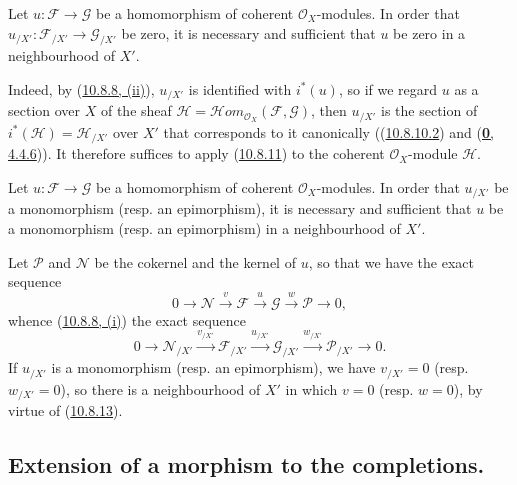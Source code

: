 \begin{corollary}[10.8.13]
\label{I.10.8.13}
Let $u:\mathscr{F}\to\mathscr{G}$ be a homomorphism of coherent
$\mathscr{O}_X$-modules. In order that
$u_{/X'}:\mathscr{F}_{/X'}\to\mathscr{G}_{/X'}$ be zero, it is necessary
and sufficient that $u$ be zero in a neighbourhood of $X'$.
\end{corollary}

Indeed, by (\hyperref[I.10.8.8]{10.8.8, (ii)}), $u_{/X'}$
is identified with $i^*(u)$, so if we regard $u$ as a section over
$X$ of the sheaf
$\mathscr{H}=\mathscr{H}\!om_{\mathscr{O}_X}(\mathscr{F},\mathscr{G})$,
then $u_{/X'}$ is the section of
$i^*(\mathscr{H})=\mathscr{H}_{/X'}$ over $X'$ that corresponds to it
canonically ((\hyperref[I.10.8.10.2]{10.8.10.2}) and
(\hyperref[0.4.4.6]{\textbf{0}, 4.4.6})). It therefore suffices to apply
(\hyperref[I.10.8.11]{10.8.11}) to the coherent $\mathscr{O}_X$-module
$\mathscr{H}$.

\begin{corollary}[10.8.14]
\label{I.10.8.14}
Let $u:\mathscr{F}\to\mathscr{G}$ be a homomorphism of coherent
$\mathscr{O}_X$-modules. In order that $u_{/X'}$ be a monomorphism
\textup{(resp.} an epimorphism), it is necessary and sufficient that $u$ be a
monomorphism \textup{(resp.} an epimorphism) in a neighbourhood of $X'$.
\end{corollary}

Let $\mathscr{P}$ and $\mathscr{N}$ be the cokernel and the kernel of
$u$, so that we have the exact sequence
\[
  0\to\mathscr{N}\xrightarrow{v}\mathscr{F}\xrightarrow{u}
  \mathscr{G}\xrightarrow{w}\mathscr{P}\to0,
\]
whence (\hyperref[I.10.8.8]{10.8.8, (i)}) the exact sequence
\[
  0\to\mathscr{N}_{/X'}\xrightarrow{v_{/X'}}
  \mathscr{F}_{/X'}\xrightarrow{u_{/X'}}
  \mathscr{G}_{/X'}\xrightarrow{w_{/X'}}
  \mathscr{P}_{/X'}\to0.
\]
If $u_{/X'}$ is a monomorphism (resp. an epimorphism), we have
$v_{/X'}=0$ (resp. $w_{/X'}=0$), so there is a neighbourhood of $X'$ in
which $v=0$ (resp. $w=0$), by virtue of
(\hyperref[I.10.8.13]{10.8.13}).

\subsection{Extension of a morphism to the completions.}
\label{subsection:I.10.9}

